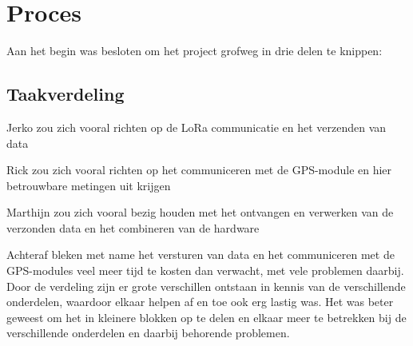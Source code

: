 \section{Proces}
Aan het begin was besloten om het project grofweg in drie delen te knippen:

\subsection{Taakverdeling}
Jerko zou zich vooral richten op de LoRa communicatie en het verzenden van data

Rick zou zich vooral richten op het communiceren met de GPS-module en hier
betrouwbare metingen uit krijgen

Marthijn zou zich vooral bezig houden met het ontvangen en verwerken van de
verzonden data en het combineren van de hardware

Achteraf bleken met name het versturen van data en het communiceren met de
GPS-modules veel meer tijd te kosten dan verwacht, met vele problemen daarbij.
Door de verdeling zijn er grote verschillen ontstaan in kennis van de
verschillende onderdelen, waardoor elkaar helpen af en toe ook erg lastig was.
Het was beter geweest om het in kleinere blokken op te delen en elkaar meer te
betrekken bij de verschillende onderdelen en daarbij behorende problemen.

